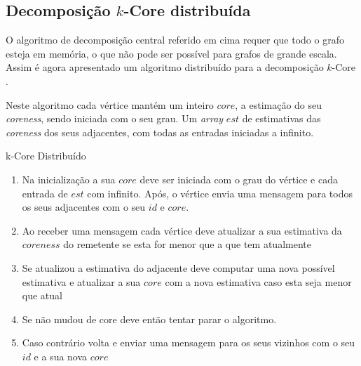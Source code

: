 \newpage
\subsection{Decomposição $k$-Core distribuída}
O algoritmo de decomposição central referido em cima requer que todo o grafo esteja em memória, o que não pode ser possível para grafos de grande escala. Assim é agora apresentado um algoritmo distribuído para a decomposição $k$-Core \cite{kCoreDis}.



%

Neste algoritmo cada vértice mantém um inteiro $core$, a estimação do seu \textit{coreness}, sendo iniciada com o seu grau. Um \textit{array} $est$ de estimativas das \textit{coreness} dos seus adjacentes, com todas as entradas iniciadas a infinito. %

\begin{algorithm}
\caption{k-Core Distribuído}

\begin{enumerate}
	\item Na inicialização a sua $core$ deve ser iniciada com o grau do vértice e cada entrada de $est$ com infinito. Após, o vértice envia uma mensagem para todos os seus adjacentes com o seu $id$ e $core$.
	\item Ao receber uma mensagem cada vértice deve atualizar a sua estimativa da $coreness$ do remetente se esta for menor que a que tem atualmente
	\item Se atualizou a estimativa do adjacente deve computar uma nova possível estimativa e atualizar a sua $core$ com a nova estimativa caso esta seja menor que atual
	\item Se não mudou de core deve então tentar parar o algoritmo.
	\item Caso contrário volta e enviar uma mensagem para os seus vizinhos com o seu $id$ e a sua nova $core$
\end{enumerate}
\end{algorithm}

